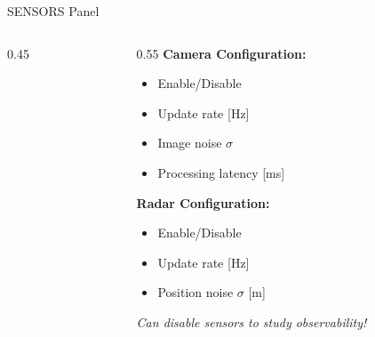\documentclass{beamer}
\begin{document}
\begin{frame}{SENSORS Panel}
\begin{columns}
\begin{column}{0.45\textwidth}
\end{column}

\begin{column}{0.55\textwidth}
\textbf{Camera Configuration:}
\begin{itemize}
    \item Enable/Disable
    \item Update rate [Hz]
    \item Image noise $\sigma$
    \item Processing latency [ms]
\end{itemize}

\vspace{0.5cm}
\textbf{Radar Configuration:}
\begin{itemize}
    \item Enable/Disable
    \item Update rate [Hz]
    \item Position noise $\sigma$ [m]
\end{itemize}

\vspace{0.3cm}
\small\textit{Can disable sensors to study observability!}
\end{column}
\end{columns}
\end{frame}
\end{document}
